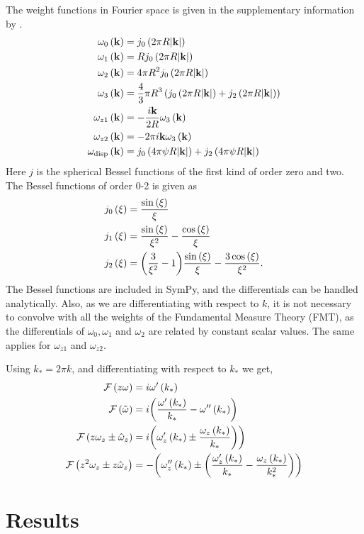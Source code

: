 \documentclass[english]{dftmemo}
\newcommand*{\lb}{\ensuremath{\left(}}
\newcommand*{\rb}{\ensuremath{\right)}}
\newcommand{\disp}{\ensuremath{\text{disp}}\xspace}
\begin{document}
The weight functions in Fourier space is given in the supplementary information by \citet{stierle2020a}.
\begin{align}
  \label{eq:weight_functions_fourier}
  \omega_0 \lb \mathbf{k}\rb &= j_0\lb 2 \pi R |\mathbf{k}| \rb  \\
  \omega_1 \lb \mathbf{k}\rb &= R j_0\lb 2 \pi R |\mathbf{k}| \rb  \\
  \omega_2 \lb \mathbf{k}\rb &= 4 \pi R^2 j_0\lb 2 \pi R |\mathbf{k}| \rb  \\
  \omega_3 \lb \mathbf{k}\rb &= \frac{4}{3} \pi R^3 \lb j_0\lb 2 \pi R |\mathbf{k}| \rb + j_2\lb 2 \pi R |\mathbf{k}| \rb \rb  \\
  \omega_{z1} \lb \mathbf{k}\rb &= - \frac{i \mathbf{k}}{2 R} \omega_3 \lb \mathbf{k}\rb  \\
  \omega_{z2} \lb \mathbf{k}\rb &= - 2 \pi i \mathbf{k} \omega_3 \lb \mathbf{k}\rb  \\
  \omega_{\disp} \lb \mathbf{k}\rb &= j_0\lb 4 \pi \psi R |\mathbf{k}| \rb + j_2\lb 4 \pi \psi R |\mathbf{k}| \rb
\end{align}
Here $j$ is the spherical Bessel functions of the first kind of order
zero and two. The Bessel functions of order 0-2 is given as
\begin{align}
  \label{eq:bessel_functions}
  j_0\lb \xi \rb &= \frac{\sin \lb \xi \rb}{\xi} \\
  j_1\lb \xi \rb &= \frac{\sin \lb \xi \rb}{\xi^2} - \frac{\cos \lb \xi \rb}{\xi}  \\
  j_2\lb \xi \rb &= \biggl(\frac{3}{\xi^2} - 1\biggr) \frac{\sin \lb \xi \rb}{\xi} - \frac{3 \cos \lb \xi \rb}{\xi^2}.
\end{align}
The Bessel functions are included in SymPy, and the differentials can
be handled analytically. Also, as we are differentiating with respect
to $k$, it is not necessary to convolve with all the weights of the
Fundamental Measure Theory (FMT), as the differentials of
$\omega_0, \omega_1$ and $\omega_2$ are related by constant scalar
values. The same applies for $\omega_{z1}$ and $\omega_{z2}$.

Using $k_* = 2 \pi k$, and differentiating with respect to $k_*$ we get,
\begin{align}
  \mathcal{F}\lb z \omega \rb &= i \omega^\prime \lb k_* \rb \\
  \mathcal{F}\lb \tilde{\omega} \rb &= i\biggl( \frac{\omega^\prime \lb k_* \rb}{k_*} - \omega^{\prime\prime} \lb k_* \rb \biggr) \\
  \mathcal{F}\lb z \omega_z \pm \hat{\omega}_z \rb &= i \biggl( \omega_z^\prime \lb k_* \rb \pm \frac{\omega_z \lb k_* \rb}{k_*} \biggr)\biggr) \\
  \mathcal{F}\lb z^2 \omega_z \pm z\hat{\omega}_z \rb &= -\biggl( \omega_z^{\prime\prime} \lb k_* \rb \pm \biggl( \frac{\omega_z^\prime \lb k_* \rb}{k_*} - \frac{\omega_z \lb k_* \rb}{k_*^{2}}\biggr)\biggr)
\end{align}

\section{Results}



\clearpage


\end{document}
